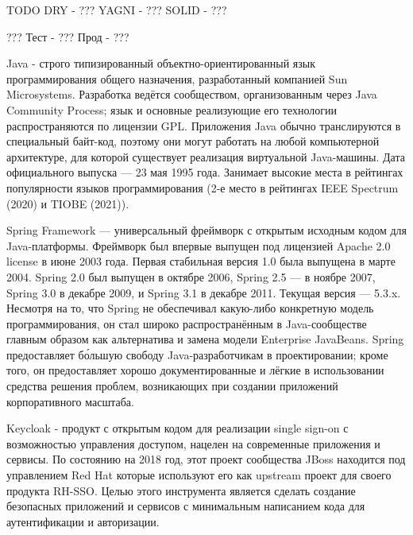 
    TODO
        DRY - ???
        YAGNI - ???
        SOLID - ???
    
        ???
        Тест - ???
        Прод - ???
    \anonsubsection{}
    \anonsubsection{}
    \anonsubsection{}
    \anonsubsection{}
    \anonsubsection{}
    \anonsubsection{}

        Java - строго типизированный объектно-ориентированный язык программирования общего назначения, разработанный компанией Sun Microsystems. Разработка ведётся сообществом, организованным через Java Community Process; язык и основные реализующие его технологии распространяются по лицензии GPL. Приложения Java обычно транслируются в специальный байт-код, поэтому они могут работать на любой компьютерной архитектуре, для которой существует реализация виртуальной Java-машины. Дата официального выпуска — 23 мая 1995 года. Занимает высокие места в рейтингах популярности языков программирования (2-е место в рейтингах IEEE Spectrum (2020) и TIOBE (2021)).

        Spring Framework — универсальный фреймворк с открытым исходным кодом для Java-платформы. Фреймворк был впервые выпущен под лицензией Apache 2.0 license в июне 2003 года. Первая стабильная версия 1.0 была выпущена в марте 2004. Spring 2.0 был выпущен в октябре 2006, Spring 2.5 — в ноябре 2007, Spring 3.0 в декабре 2009, и Spring 3.1 в декабре 2011. Текущая версия — 5.3.x. Несмотря на то, что Spring не обеспечивал какую-либо конкретную модель программирования, он стал широко распространённым в Java-сообществе главным образом как альтернатива и замена модели Enterprise JavaBeans. Spring предоставляет бо́льшую свободу Java-разработчикам в проектировании; кроме того, он предоставляет хорошо документированные и лёгкие в использовании средства решения проблем, возникающих при создании приложений корпоративного масштаба.

        Keycloak - продукт с открытым кодом для реализации single sign-on с возможностью управления доступом, нацелен на современные приложения и сервисы. По состоянию на 2018 год, этот проект сообщества JBoss находится под управлением Red Hat которые используют его как upstream проект для своего продукта RH-SSO. Целью этого инструмента является сделать создание безопасных приложений и сервисов с минимальным написанием кода для аутентификации и авторизации. 

